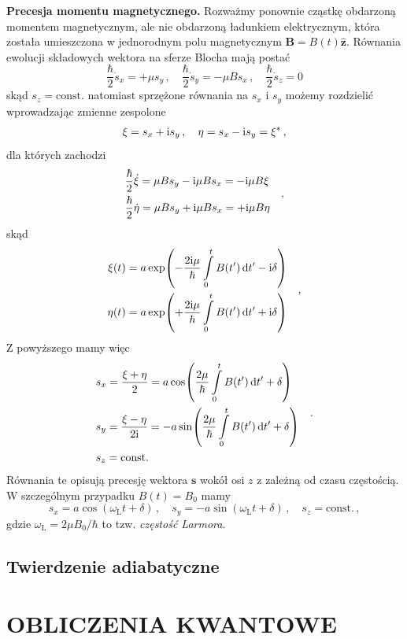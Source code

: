 \documentclass{myclass}
\begin{document}
\linesep

\textbf{Precesja momentu magnetycznego.} Rozważmy ponownie cząstkę obdarzoną momentem magnetycznym,
ale nie obdarzoną ładunkiem elektrycznym, która została umieszczona w jednorodnym polu magnetycznym
\(\mathbf{B} = B(t)\mathbf{\hat{z}}\). Równania ewolucji składowych wektora na sferze Blocha mają
postać
\begin{equation*}
    \frac{\hbar}{2}\dot{s}_x = +\mu s_y\,,\quad \frac{\hbar}{2}\dot{s}_y = -\mu Bs_x\,,\quad \frac{\hbar}{2}\dot{s}_z = 0
\end{equation*}
skąd \(s_z = \text{const.}\) natomiast sprzężone równania na \(s_x\) i \(s_y\) możemy rozdzielić
wprowadzając zmienne zespolone
\begin{equation*}
    \xi = s_x + \mathrm{i} s_y\,,\quad \eta = s_x - \mathrm{i} s_y = \xi^*\,,
\end{equation*}
dla których zachodzi
\begin{equation*}
    \begin{split}
        &\frac{\hbar}{2}\dot{\xi} = \mu B s_y - \mathrm{i} \mu B s_x = -\mathrm{i} \mu B \xi\\
        &\frac{\hbar}{2}\dot{\eta} = \mu B s_y + \mathrm{i} \mu B s_x = +\mathrm{i} \mu B \eta
    \end{split}\quad,
\end{equation*}
skąd
\begin{equation*}
    \begin{split}
        \xi(t) = a\exp(-\frac{2\mathrm{i}\mu}{\hbar}\int\limits_0^tB(t')\dd{t'} - \mathrm{i}\delta)\\
        \eta(t) = a\exp(+\frac{2\mathrm{i}\mu}{\hbar}\int\limits_0^tB(t')\dd{t'} + \mathrm{i}\delta)
    \end{split}\quad,
\end{equation*}
Z powyższego mamy więc
\begin{equation*}
    \begin{split}
        &s_x = \frac{\xi + \eta}{2} = a \cos(\frac{2\mu}{\hbar}\int\limits_0^tB(t')\dd{t'} + \delta)\\
        &s_y = \frac{\xi - \eta}{2\mathrm{i}} = -a\sin(\frac{2\mu}{\hbar}\int\limits_0^tB(t')\dd{t'} + \delta)\\
        &s_z = \text{const.}
    \end{split}\quad.
\end{equation*}
Równania te opisują precesję wektora \(\mathbf{s}\) wokół osi \(z\) z zależną od czasu częstością. W
szczególnym przypadku \(B(t) = B_0\) mamy
\begin{equation*}
    s_x = a\cos(\omega_\text{L}t + \delta)\,,\quad s_y = -a\sin(\omega_\text{L}t + \delta)\,,\quad s_z=\text{const.}\,,
\end{equation*}
gdzie \(\boxed{\omega_\text{L} = 2\mu B_0/\hbar }\) to tzw. \textit{częstość Larmora}.

\subsection{Twierdzenie adiabatyczne}

\newpage
\section{OBLICZENIA KWANTOWE}
\end{document}
